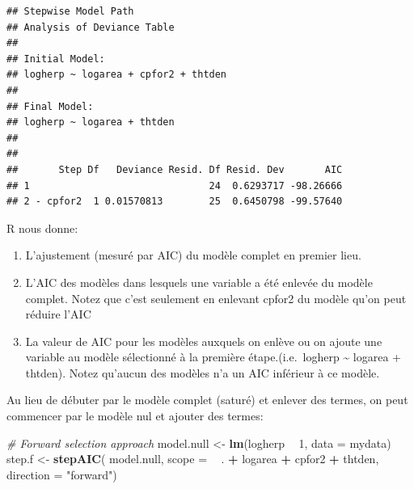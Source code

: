 \documentclass[12pt,]{book}
\newenvironment{Shaded}{\begin{snugshade}}{\end{snugshade}}
\newcommand{\CommentTok}[1]{\textcolor[rgb]{0.56,0.35,0.01}{\textit{#1}}}
\newcommand{\DataTypeTok}[1]{\textcolor[rgb]{0.13,0.29,0.53}{#1}}
\newcommand{\DecValTok}[1]{\textcolor[rgb]{0.00,0.00,0.81}{#1}}
\newcommand{\KeywordTok}[1]{\textcolor[rgb]{0.13,0.29,0.53}{\textbf{#1}}}
\newcommand{\NormalTok}[1]{#1}
\newcommand{\OperatorTok}[1]{\textcolor[rgb]{0.81,0.36,0.00}{\textbf{#1}}}
\newcommand{\StringTok}[1]{\textcolor[rgb]{0.31,0.60,0.02}{#1}}
\providecommand{\tightlist}{%
  \setlength{\itemsep}{0pt}\setlength{\parskip}{0pt}}
\begin{document}
\begin{Shaded}
\end{Shaded}

\begin{verbatim}
## Stepwise Model Path 
## Analysis of Deviance Table
## 
## Initial Model:
## logherp ~ logarea + cpfor2 + thtden
## 
## Final Model:
## logherp ~ logarea + thtden
## 
## 
##       Step Df   Deviance Resid. Df Resid. Dev       AIC
## 1                               24  0.6293717 -98.26666
## 2 - cpfor2  1 0.01570813        25  0.6450798 -99.57640
\end{verbatim}

R nous donne:

\begin{enumerate}
\def\labelenumi{\arabic{enumi}.}
\tightlist
\item
  L'ajustement (mesuré par AIC) du modèle complet en premier lieu.
\item
  L'AIC des modèles dans lesquels une variable a été enlevée du modèle complet. Notez que c'est seulement en enlevant cpfor2 du modèle qu'on peut réduire l'AIC
\item
  La valeur de AIC pour les modèles auxquels on enlève ou on ajoute une variable au modèle sélectionné à la première étape.(i.e.~logherp \textasciitilde{} logarea + thtden). Notez qu'aucun des modèles n'a un AIC inférieur à ce modèle.
\end{enumerate}

Au lieu de débuter par le modèle complet (saturé) et enlever des termes, on peut commencer par le modèle nul et ajouter des termes:

\begin{Shaded}
\begin{Highlighting}[]
\CommentTok{# Forward selection approach}
\NormalTok{model.null <-}\StringTok{ }\KeywordTok{lm}\NormalTok{(logherp }\OperatorTok{~}\StringTok{ }\DecValTok{1}\NormalTok{, }\DataTypeTok{data =}\NormalTok{ mydata)}
\NormalTok{step.f <-}\StringTok{ }\KeywordTok{stepAIC}\NormalTok{(}
\NormalTok{  model.null,}
  \DataTypeTok{scope =} \OperatorTok{~}\StringTok{ }\NormalTok{. }\OperatorTok{+}\StringTok{ }\NormalTok{logarea }\OperatorTok{+}\StringTok{ }\NormalTok{cpfor2 }\OperatorTok{+}\StringTok{ }\NormalTok{thtden, }\DataTypeTok{direction =} \StringTok{"forward"}\NormalTok{)}
\end{Highlighting}
\end{Shaded}
\end{document}
